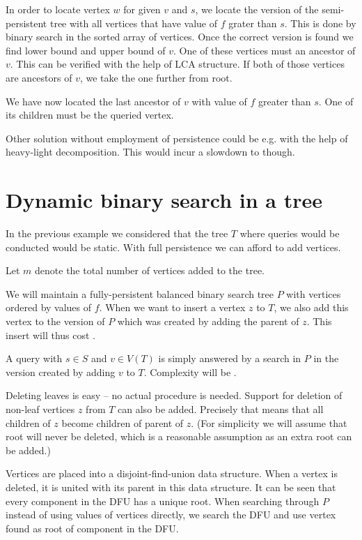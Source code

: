 In order to locate vertex $w$ for given $v$ and $s$, we locate the version of the semi-persistent tree with all vertices that have value of $f$ grater than $s$. This is done by binary search in the sorted array of vertices. Once the correct version is found we find lower bound and upper bound of $v$. One of these vertices must an ancestor of $v$. This can be verified with the help of LCA structure. If both of those vertices are ancestors of $v$, we take the one further from root. 

We have now located the last ancestor of $v$ with value of $f$ greater than $s$. One of its children must be the queried vertex.

Other solution without employment of persistence could be e.g. with the help of heavy-light decomposition. This would incur a slowdown to  though.

\section{Dynamic binary search in a tree}

In the previous example we considered that the tree $T$ where queries would be conducted would be static. With full persistence we can afford to add vertices. %

Let $m$ denote the total number of vertices added to the tree.

We will maintain a fully-persistent balanced binary search tree $P$ with vertices ordered by values of $f$. When we want to insert a vertex $z$ to $T$, we also add this vertex to the version of $P$ which was created by adding the parent of $z$. This insert will thus cost .

A query with $s \in S$ and $v \in V(T)$ is simply answered by a search in $P$ in the version created by adding $v$ to $T$. Complexity will be .

Deleting leaves is easy -- no actual procedure is needed. Support for deletion of non-leaf vertices $z$ from $T$ can also be added. Precisely that means that all children of $z$ become children of parent of $z$. (For simplicity we will assume that root will never be deleted, which is a reasonable assumption as an extra root can be added.) 

Vertices are placed into a disjoint-find-union data structure. When a vertex is deleted, it is united with its parent in this data structure. It can be seen that every component in the DFU has a unique root. When searching through $P$ instead of using values of vertices directly, we search the DFU and use vertex found as root of component in the DFU.

